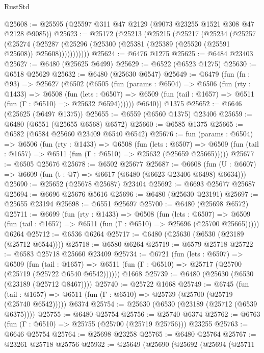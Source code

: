 \begin{lexlean}{RustStd}
\begin{coremodule}
@25608 := @25595 (@25597 @311 @47 @2129 (@9073 @23255 @1521 @308 @47 @2128 @9085))
@25623 := @25172
    (@25213
      (@25215
        (@25217
          (@25234
            (@25257
              (@25274
                (@25287 (@25296 (@25300 (@25381 (@25389 (@25520 (@25591 @25608)) @25608)))))))))))
@25624 := @6476 @1275
@25625 := @6484 @23403
@25627 := @6480 (@25625 @6499)
@25629 := @6522 (@6523 @1275)
@25630 := @6518 @25629
@25632 := @6480 (@25630 @6547)
@25649 := @6479
    (fun (fn : @93) =>
    @25627
      (@6502
        (@6505
          (fun (params : @6504) =>
          @6506
            (fun (rty : @1433) =>
            @6508
              (fun (lets : @6507) =>
              @6509 (fun (tail : @1657) => @6511 (fun (Γ : @6510) => @25632 @6594))))))
        @6640))
    @1375
@25652 := @6646 (@25625 (@6497 @1375))
@25655 := @6559 (@6560 @1375) @23406
@25659 := @6480 (@6551 (@25655 @6568) @6572)
@25660 := @6585 @1375
@25665 := @6582 (@6584 @25660 @23409 @6540 @6542)
@25676 := fun (params : @6504) =>
  @6506
    (fun (rty : @1433) =>
    @6508
      (fun (lets : @6507) =>
      @6509 (fun (tail : @1657) => @6511 (fun (Γ : @6510) => @25632 (@25659 @25665)))))
@25677 := @6505 @25676
@25678 := @6502 @25677
@25687 := @6608
    (fun (U : @6607) => @6609 (fun (t : @7) => @6617 (@6480 (@6623 @23406 @6498) @6634)))
@25690 := @25652 (@25678 @25687) @23404
@25692 := @6693 @25677 @25687
@25694 := @6696 @25676 @5616
@25696 := @6480 (@25630 @23191)
@25697 := @25655 @23194
@25698 := @6551 @25697
@25700 := @6480 (@25698 @6572)
@25711 := @6699
    (fun (rty : @1433) =>
    @6508
      (fun (lets : @6507) =>
      @6509 (fun (tail : @1657) => @6511 (fun (Γ : @6510) => @25696 (@25700 @25665)))))
    @6264
@25712 := @6536 @6264
@25717 := @6480 (@25630 (@6530 (@23189 (@25712 @6544))))
@25718 := @6580 @6264
@25719 := @6579 @25718
@25722 := @6583 @25718 @25660 @23409
@25734 := @6721
    (fun (lets : @6507) =>
    @6509
      (fun (tail : @1657) =>
      @6511 (fun (Γ : @6510) => @25717 (@25700 (@25719 (@25722 @6540 @6542))))))
    @1668
@25739 := @6480 (@25630 (@6530 (@23189 (@25712 @8467))))
@25740 := @25722 @1668
@25749 := @6745
    (fun (tail : @1657) => @6511 (fun (Γ : @6510) => @25739 (@25700 (@25719 (@25740 @6542)))))
    @6374
@25754 := @25630 (@6530 (@23189 (@25712 (@6539 @6375))))
@25755 := @6480 @25754
@25756 := @25740 @6374
@25762 := @6763 (fun (Γ : @6510) => @25755 (@25700 (@25719 @25756))) @23255
@25763 := @6646 @25754
@25764 := @25698 @23258
@25765 := @6480 @25764
@25767 := @23261 @25718 @25756
@25932 := @25649
    (@25690
      (@25692
        (@25694
          (@25711

\end{coremodule}
\end{lexlean}
